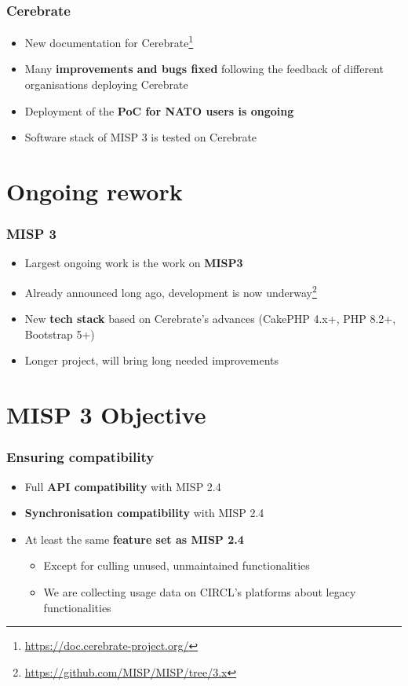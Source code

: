 \begin{frame}
    \frametitle{Cerebrate}
    \begin{itemize}
        \item New documentation for Cerebrate\footnote{\url{https://doc.cerebrate-project.org/}}
        \item Many {\bf improvements and bugs fixed} following the feedback of different organisations deploying Cerebrate
        \item Deployment of the {\bf PoC for NATO users is ongoing}
        \item Software stack of MISP 3 is tested on Cerebrate
    \end{itemize}

\end{frame}

\section{Ongoing rework}

\begin{frame}
  \frametitle{MISP 3}
  \begin{itemize}
     \item Largest ongoing work is the work on {\bf MISP3}
     \item Already announced long ago, development is now underway\footnote{\url{https://github.com/MISP/MISP/tree/3.x}}
     \item New {\bf tech stack} based on Cerebrate's advances (CakePHP 4.x+, PHP 8.2+, Bootstrap 5+)
     \item Longer project, will bring long needed improvements
  \end{itemize}
\end{frame}

\section{MISP 3 Objective}

\begin{frame}
  \frametitle{Ensuring compatibility}
  \begin{itemize}
     \item Full {\bf API compatibility} with MISP 2.4
     \item {\bf Synchronisation compatibility} with MISP 2.4
     \item At least the same {\bf feature set as MISP 2.4}
     \begin{itemize}
         \item Except for culling unused, unmaintained functionalities
         \item We are collecting usage data on CIRCL's platforms about legacy functionalities
     \end{itemize}
  \end{itemize}
\end{frame}

